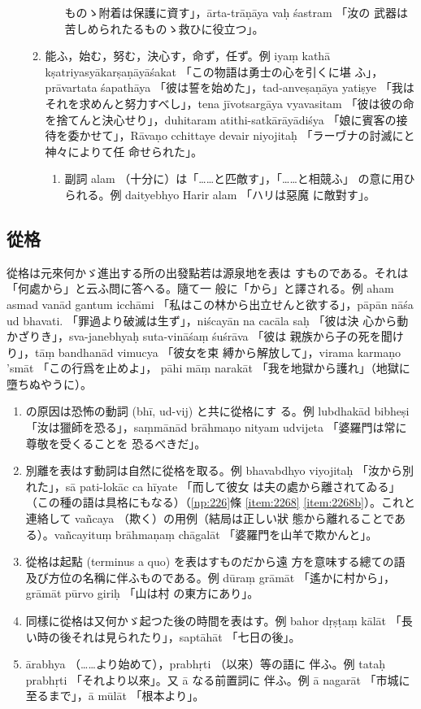 \begin{enumerate}[label=(\Alph*)]
\begin{enumerate}[label=(\arabic*)]
\begin{enumerate}[label=(\alph*)]
ものゝ附着は保護に資す」，ārta-trāṇāya vaḥ śastram 「汝の
武器は苦しめられたるものゝ救ひに役立つ」。
\end{enumerate}
\item 能ふ，始む，努む，決心す，命ず，任ず。例 iyaṃ kathā
kṣatriyasyākarṣaṇāyāśakat 「この物語は勇士の心を引くに堪
ふ」，prāvartata śapathāya 「彼は誓を始めた」，tad-anveṣaṇāya
yatiṣye 「我はそれを求めんと努力すべし」，tena jīvotsargāya
vyavasitam 「彼は彼の命を捨てんと決心せり」，duhitaram
atithi-satkārāyādiśya 「娘に賓客の接待を委かせて」，Rāvaṇo\-%
cchittaye devair niyojitaḥ 「ラーヷナの討滅にと神々によりて任
命せられた」。
\begin{enumerate}[label=(\alph*)]
\item 副詞 alam （十分に）は「……と匹敵す」，「……と相競ふ」
の意に用ひられる。例 daityebhyo Harir alam 「ハリは惡魔
に敵對す」。
\end{enumerate}
\end{enumerate}
\end{enumerate}

\subsection{從格}
\numberParagraph
從格は元來何かゞ進出する所の出發點若は源泉地を表は
すものである。それは「何處から」と云ふ問に答へる。隨て一
般に「から」と譯される。例 aham asmad vanād gantum
icchāmi 「私はこの林から出立せんと欲する」，pāpān nāśa ud\-%
bhavati. 「罪過より破滅は生ず」，niścayān na cacāla saḥ 「彼は決
心から動かざりき」，sva-janebhyaḥ suta-vināśaṃ śuśrāva 「彼は
親族から子の死を聞けり」，tāṃ bandhanād vimucya 「彼女を束
縛から解放して」，virama karmaṇo 'smāt 「この行爲を止めよ」，
pāhi māṃ narakāt 「我を地獄から護れ」（地獄に墮ちぬやうに）。
\begin{enumerate}[label=(\alph*)]
\item {}の原因は恐怖の動詞 (bhī, ud-vij) と共に從格にす
る。例 lubdhakād bibheṣi 「汝は獵師を恐る」，saṃmānād
brāhmaṇo nityam udvijeta 「婆羅門は常に尊敬を受くることを
恐るべきだ」。
\item 別離を表はす動詞は自然に從格を取る。例 bhavabdhyo
viyojitaḥ 「汝から別れた」，sā pati-lokāc ca hīyate 「而して彼女
は夫の處から離されてゐる」（この種の語は具格にもなる）（\ref{np:226}條
\ref{item:2268} \ref{item:2268b}）。これと連絡して vañcaya （欺く）の用例（結局は正しい狀
態から離れることである）。vañcayituṃ brāhmaṇaṃ chāgalāt
「婆羅門を山羊で欺かんと」。
\item 從格は起點 (terminus a quo) を表はすものだから遠
方を意味する總ての語及び方位の名稱に伴ふものである。例
dūraṃ grāmāt 「遙かに村から」，grāmāt pūrvo giriḥ 「山は村
の東方にあり」。
\item 同樣に從格は又何かゞ起つた後の時間を表はす。例
bahor dṛṣṭaṃ kālāt 「長い時の後それは見られたり」，saptāhāt
「七日の後」。
\item ārabhya （……より始めて），prabhṛti （以來）等の語に
伴ふ。例 tataḥ prabhṛti 「それより以來」。又 ā なる前置詞に
伴ふ。例 ā nagarāt 「市城に至るまで」，ā mūlāt 「根本より」。
\end{enumerate}


